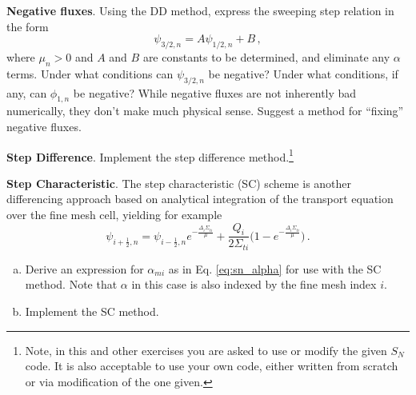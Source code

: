 \begin{exercises}

  \item \textbf{Negative fluxes}. Using the DD method, express the sweeping step relation in the form
  \begin{equation*}
    \psi_{3/2,n} = A \psi_{1/2,n} + B \, ,
  \end{equation*}
  where $\mu_n > 0$ and $A$ and $B$ are constants to be determined, and eliminate any $\alpha$ terms.  Under what conditions can $\psi_{3/2,n}$ be negative?  Under what conditions, if any, can $\phi_{1,n}$ be negative?  While negative fluxes are not inherently bad numerically, they don't make much physical sense.  Suggest a method for ``fixing'' negative fluxes.

  \item \textbf{Step Difference}.  Implement the step difference method.\footnote{Note, in this and other exercises you are asked to use or modify the given $S_N$ code.  It is also acceptable to use your own code, either written from scratch or via modification of the one given.}

  \item \textbf{Step Characteristic}.  The step characteristic (SC) scheme is another differencing approach based on analytical integration of the transport equation over the fine mesh cell, yielding for example
  \begin{equation*}
    \psi_{i+\frac{1}{2},n}  =  \psi_{i-\frac{1}{2},n} e^{- \frac{\Delta_i \Sigma_{ti}}{\mu}} + \frac{Q_i}{2\Sigma_{ti}} \Big ( 1-e^{-\frac{\Delta_i \Sigma_{ti}}{\mu}} \Big ) \, .
  \end{equation*}
  \begin{enumerate}[(a)]
    \item Derive an expression for $\alpha_{mi}$ as in Eq. \ref{eq:sn_alpha} for use with the SC method.  Note that $\alpha$ in this case is also indexed by the fine mesh index $i$.
    \item Implement the SC method.
  \end{enumerate}
 

\end{exercises}
